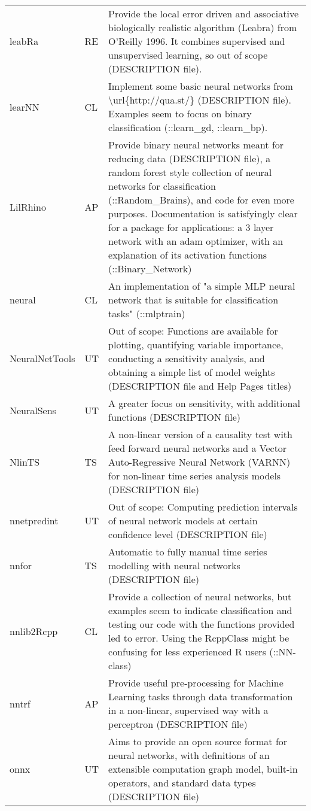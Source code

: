 \begin{Schunk}
\begin{longtable}[t]{ll>{\raggedright\arraybackslash}p{10cm}}
leabRa & RE & Provide the local error driven and associative biologically realistic algorithm (Leabra) from O'Reilly 1996. It combines supervised and unsupervised learning, so out of scope (DESCRIPTION file).\\
learNN & CL & Implement some basic neural networks from \textbackslash{}url\{http://qua.st/\} (DESCRIPTION file). Examples seem to focus on binary classification (::learn\_gd, ::learn\_bp).\\
\addlinespace
LilRhino & AP & Provide binary neural networks meant for reducing data (DESCRIPTION file), a random forest style collection of neural networks for classification (::Random\_Brains), and code for even more purposes. Documentation is satisfyingly clear for a package for applications: a 3 layer network with an adam optimizer, with an explanation of its activation functions (::Binary\_Network)\\
neural & CL & An implementation of "a simple MLP neural network that is suitable for classification tasks" (::mlptrain)\\
NeuralNetTools & UT & Out of scope: Functions are available for plotting, quantifying variable importance, conducting a sensitivity analysis, and obtaining a simple list of model weights (DESCRIPTION file and Help Pages titles)\\
NeuralSens & UT & A greater focus on sensitivity, with additional functions (DESCRIPTION file)\\
NlinTS & TS & A non-linear version of a causality test with feed forward neural networks and a Vector Auto-Regressive Neural Network (VARNN) for non-linear time series analysis models (DESCRIPTION file)\\
\addlinespace
nnetpredint & UT & Out of scope: Computing prediction intervals of neural network models at certain confidence level (DESCRIPTION file)\\
nnfor & TS & Automatic to fully manual time series modelling with neural networks (DESCRIPTION file)\\
nnlib2Rcpp & CL & Provide a collection of neural networks, but examples seem to indicate classification and testing our code with the functions provided led to error. Using the RcppClass might be confusing for less experienced R users (::NN-class)\\
nntrf & AP & Provide useful pre-processing for Machine Learning tasks through data transformation in a non-linear, supervised way with a perceptron (DESCRIPTION file)\\
onnx & UT & Aims to provide an open source format for neural networks, with definitions of an extensible computation graph model, built-in operators, and standard data types (DESCRIPTION file)\\

\end{longtable}
\end{Schunk}
